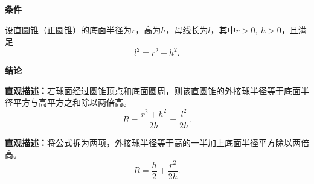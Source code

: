\begin{statementbox}
	\textbf{\textcolor{CStatement}{条件}}
	\begin{description}[style=nextline, leftmargin=2.8em, labelsep=0.5em, itemsep=0.35em]
		\item[\textbf{\textcolor{CStatement}{条件1（直圆锥的底面半径、高、母线）：}}] 设直圆锥（正圆锥）的底面半径为$r$，高为$h$，母线长为$l$，其中$r>0,\ h>0$，且满足
		      \[
			      l^2 = r^2 + h^2.
		      \]
	\end{description}

	\textbf{\textcolor{CStatement}{结论}}
	\begin{description}[style=nextline, leftmargin=2.8em, labelsep=0.5em, itemsep=0.45em]
		\item[\textbf{\textcolor{CStatement}{结论一（外接球半径）：}}]
		      \textbf{\textcolor{CStatement}{直观描述：}}若球面经过圆锥顶点和底面圆周，则该直圆锥的外接球半径等于底面半径平方与高平方之和除以两倍高。
		      \[
			      R = \frac{r^2+h^2}{2h} = \frac{l^2}{2h}.
		      \]

		\item[\textbf{\textcolor{CStatement}{推广结论（拆项变形）：}}]
		      \textbf{\textcolor{CStatement}{直观描述：}}将公式拆为两项，外接球半径等于高的一半加上底面半径平方除以两倍高。
		      \[
			      R = \frac{h}{2} + \frac{r^2}{2h}.
		      \]
	\end{description}
\end{statementbox}